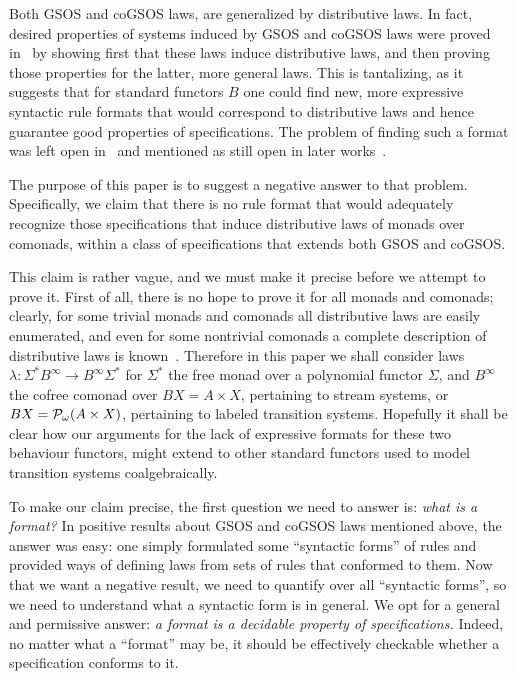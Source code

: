 \documentclass[adraft,copyright,creativecommons]{eptcs}
\newcommand{\Bb}{B^{\infty}}
\newcommand{\Ss}{\Sigma^*}
\renewcommand{\S}{\Sigma}
\newcommand{\Pf}{{\cal P}_{\omega}}
\begin{document}
Both GSOS and coGSOS laws, are generalized by distributive laws. In fact, desired properties of systems induced by GSOS and coGSOS laws were proved in~\cite{turiplotkin} by showing first that these laws induce distributive laws, and then proving those properties for the latter, more general laws. This is tantalizing, as it suggests that for standard functors $B$ one could find new, more expressive syntactic rule formats that would correspond to distributive laws and hence guarantee good properties of specifications. The problem of finding such a format was left open in~\cite{turiplotkin} and mentioned as still open in later works~\cite{bartelsthesis,tcs11}.

The purpose of this paper is to suggest a negative answer to that problem. Specifically, we claim that there is no rule format
that would adequately recognize those specifications that induce distributive laws of monads over comonads, within a class of specifications that extends both GSOS and coGSOS.

This claim is rather vague, and we must make it precise before we attempt to prove it. First of all, there is no hope to prove it for all monads and comonads; clearly, for some trivial monads and comonads all distributive laws are easily enumerated, and even for some nontrivial comonads a complete description of distributive laws is known~\cite{kickformat}. Therefore in this paper we shall consider laws $\lambda:\Ss\Bb\to\Bb\Ss$ for $\Ss$ the free monad over a polynomial functor $\S$, and $\Bb$ the cofree comonad over
 $BX = A\times X$, pertaining to stream systems, or
$BX = \Pf(A\times X)$, pertaining to labeled transition systems.
Hopefully it shall be clear how our arguments for the lack of expressive formats for these two behaviour functors, might extend to other standard functors used to model transition systems coalgebraically.

To make our claim precise, the first question we need to answer is: {\em what is a format?} In positive results about GSOS and coGSOS laws mentioned above, the answer was easy: one simply formulated some ``syntactic forms'' of rules and provided ways of defining laws from sets of rules that conformed to them. Now that we want a negative result, we need to quantify over all ``syntactic forms'', so we need to understand what a syntactic form is in general. We opt for a general and permissive answer:
{\em a format is a decidable property of specifications.} Indeed, no matter what a ``format'' may be, it should be effectively checkable whether a specification conforms to it. 
\end{document}
